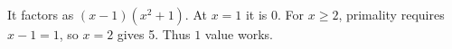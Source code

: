 It factors as $(x-1)(x^2+1)$. At $x=1$ it is 0. For $x\ge2$, primality requires $x-1=1$, so $x=2$ gives 5. Thus $\boxed1$ value works.

